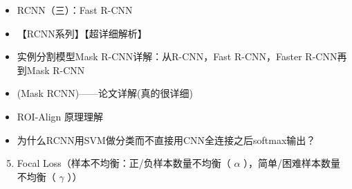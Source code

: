 \documentclass[letterpaper,10pt,english]{sphinxmanual}
\begin{document}
\begin{itemize}
\item {} 
RCNN（三）：Fast R-CNN
\begin{quote}

\end{quote}

\item {} 
【RCNN系列】【超详细解析】
\begin{quote}

\end{quote}

\item {} 
实例分割模型Mask R-CNN详解：从R-CNN，Fast R-CNN，Faster R-CNN再到Mask R-CNN
\begin{quote}

\end{quote}

\item {} 
(Mask RCNN)——论文详解(真的很详细)
\begin{quote}

\end{quote}

\item {} 
ROI-Align 原理理解
\begin{quote}

\end{quote}

\item {} 
为什么RCNN用SVM做分类而不直接用CNN全连接之后softmax输出？
\begin{quote}

\end{quote}

\end{itemize}
\begin{enumerate}
\setcounter{enumi}{4}
\item {} 
Focal Loss（样本不均衡：正/负样本数量不均衡（ \(\alpha\) ），简单/困难样本数量不均衡（ \(\gamma\) ））

\end{enumerate}
\end{document}
